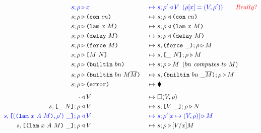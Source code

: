 \documentclass[../plutus-core-specification.tex]{subfiles}
\begin{document}
\begin{figure}[H]
\ContinuedFloat
  \begin{subfigure}[c]{\linewidth}

    \begin{minipage}{\linewidth}
\begin{alignat*}{2}
  \blue{s; \rho} & \bcompute \blue{x} &~\bmapsto~ &\blue{s;\rho^{\prime} \return V \enspace (\rho[x] = (V,\rho^{\prime}))} \qquad{\red{Really?}}\\  %
  s;\rho & \compute \con{cn}                          &~\mapsto~& s;\rho \return \con{cn}\\
  s;\rho & \compute \lamU{x}{M}                       &~\mapsto~& s;\rho \return \lamU{x}{M}\\
  s;\rho & \compute \delay{M}                         &~\mapsto~& s;\rho \return \delay{M}\\
  s;\rho & \compute \force{M}                         &~\mapsto~& s,\inForceFrame{};\rho \compute M \\
  s;\rho & \compute \appU{M}{N}                       &~\mapsto~& s,\inAppLeftFrame{N};\rho \compute M\\
  s;\rho & \compute \builtinU{bn}{\!\!}               &~\mapsto~& s;\rho \compute M
                                                 \enspace (\textit{$bn$ computes to $M$}) \\
  s;\rho & \compute \builtinU{bn}{M \repetition{M}}   &~\mapsto~& s,\inBuiltinU{bn}{}{\_}{\repetition{M}};\rho \compute M\\
  s;\rho & \compute \errorU                           &~\mapsto~& \ckerror{}\\
  \\[-10pt] %
  \cdot & \return V                              &~\mapsto~& \square (V,\rho)\\
  s,\inAppLeftFrame{N};\rho& \return V               &~\mapsto~& s,\inAppRightFrame{V};\rho \compute N\\
  \blue{s,\inAppRightFrame{(\lam{x}{A}{M}, \rho^{\prime})}; \rho} &\breturn V &~\bmapsto~& \blue{s;\rho^{\prime}[x\mapsto (V,\rho)] \compute M}\\  %
  s,\inAppRightFrame{\lam{x}{A}{M}};\rho & \return V  &~\mapsto~& s;\rho \compute \subst{V}{x}{M}\\

\end{alignat*}
\end{minipage}
\end{subfigure}
\end{figure}
\end{document}
